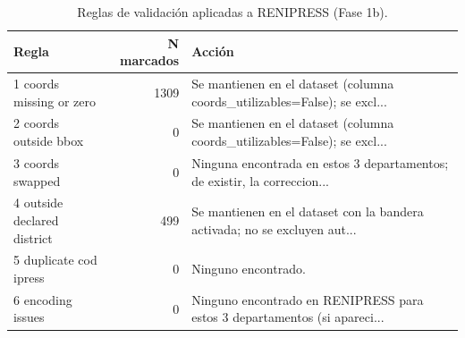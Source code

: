 \begin{table}
\caption{Reglas de validaci\'on aplicadas a RENIPRESS (Fase 1b).}
\label{tab:validacion}
\begin{tabular}{lrl}
\toprule
Regla & N marcados & Acción \\
\midrule
1 coords missing or zero & 1309 & Se mantienen en el dataset (columna coords\_utilizables=False); se excl... \\
2 coords outside bbox & 0 & Se mantienen en el dataset (columna coords\_utilizables=False); se excl... \\
3 coords swapped & 0 & Ninguna encontrada en estos 3 departamentos; de existir, la correccion... \\
4 outside declared district & 499 & Se mantienen en el dataset con la bandera activada; no se excluyen aut... \\
5 duplicate cod ipress & 0 & Ninguno encontrado. \\
6 encoding issues & 0 & Ninguno encontrado en RENIPRESS para estos 3 departamentos (si apareci... \\
\bottomrule
\end{tabular}
\end{table}
